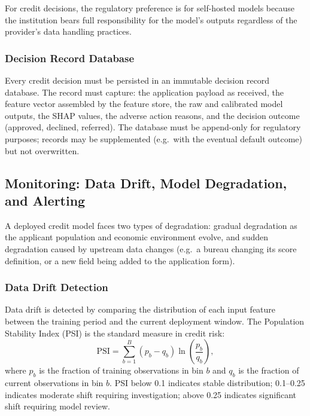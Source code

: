 \begin{context}
For credit decisions, the regulatory preference is for self-hosted models because the institution bears full responsibility for the model's outputs regardless of the provider's data handling practices.

\subsubsection*{Decision Record Database}

Every credit decision must be persisted in an immutable decision record database. The record must capture: the application payload as received, the feature vector assembled by the feature store, the raw and calibrated model outputs, the SHAP values, the adverse action reasons, and the decision outcome (approved, declined, referred). The database must be append-only for regulatory purposes; records may be supplemented (e.g.\ with the eventual default outcome) but not overwritten.

\subsection{Monitoring: Data Drift, Model Degradation, and Alerting}
\label{subsec:monitoring}

A deployed credit model faces two types of degradation: gradual degradation as the applicant population and economic environment evolve, and sudden degradation caused by upstream data changes (e.g.\ a bureau changing its score definition, or a new field being added to the application form).

\subsubsection*{Data Drift Detection}

Data drift is detected by comparing the distribution of each input feature between the training period and the current deployment window. The Population Stability Index (PSI) is the standard measure in credit risk:
\begin{equation}
  \text{PSI} = \sum_{b=1}^{B} (p_b - q_b) \ln\!\left(\frac{p_b}{q_b}\right),
  \label{eq:psi}
\end{equation}
where $p_b$ is the fraction of training observations in bin $b$ and $q_b$ is the fraction of current observations in bin $b$. PSI below 0.1 indicates stable distribution; 0.1--0.25 indicates moderate shift requiring investigation; above 0.25 indicates significant shift requiring model review.


\end{context}

